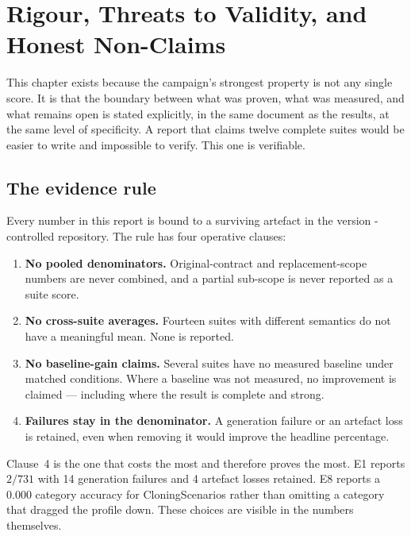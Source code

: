 \chapter{Rigour, Threats to Validity, and Honest Non-Claims}
\label{ch:rigour}

This chapter exists because the campaign's strongest property is not any single
score. It is that the boundary between what was proven, what was measured, and
what remains open is stated explicitly, in the same document as the results, at
the same level of specificity. A report that claims twelve complete suites would
be easier to write and impossible to verify. This one is verifiable.

\section{The evidence rule}

Every number in this report is bound to a surviving artefact in the version
-controlled repository. The rule has four operative clauses:

\begin{enumerate}[leftmargin=1.6em,itemsep=3pt]
  \item \textbf{No pooled denominators.} Original-contract and replacement-scope
  numbers are never combined, and a partial sub-scope is never reported as a
  suite score.
  \item \textbf{No cross-suite averages.} Fourteen suites with different
  semantics do not have a meaningful mean. None is reported.
  \item \textbf{No baseline-gain claims.} Several suites have no measured
  baseline under matched conditions. Where a baseline was not measured, no
  improvement is claimed --- including where the result is complete and strong.
  \item \textbf{Failures stay in the denominator.} A generation failure or an
  artefact loss is retained, even when removing it would improve the headline
  percentage.
\end{enumerate}

Clause~4 is the one that costs the most and therefore proves the most. E1 reports
$2/731$ with 14 generation failures and 4 artefact losses retained. E8 reports a
0.000 category accuracy for CloningScenarios rather than omitting a category that
dragged the profile down. These choices are visible in the numbers themselves.


